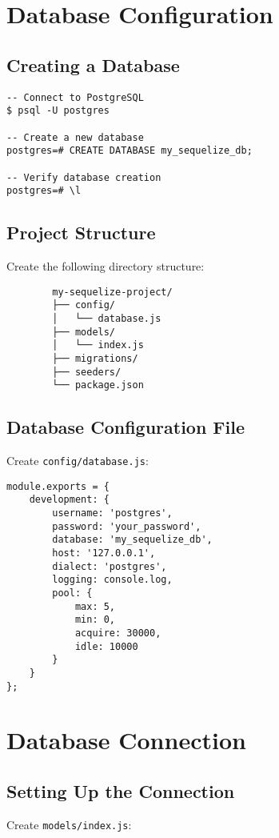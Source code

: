 \documentclass[12pt,a4paper]{book}
\begin{document}
	\section{Database Configuration}
	
	\subsection{Creating a Database}
	\begin{tcolorbox}[title=PostgreSQL Commands]
		\begin{verbatim}
-- Connect to PostgreSQL
$ psql -U postgres

-- Create a new database
postgres=# CREATE DATABASE my_sequelize_db;

-- Verify database creation
postgres=# \l
		\end{verbatim}
	\end{tcolorbox}
	
	\subsection{Project Structure}
	Create the following directory structure:
	
	\begin{verbatim}
		my-sequelize-project/
		├── config/
		│   └── database.js
		├── models/
		│   └── index.js
		├── migrations/
		├── seeders/
		└── package.json
	\end{verbatim}
	
	\subsection{Database Configuration File}
	Create \texttt{config/database.js}:
	
	\begin{verbatim}
module.exports = {
	development: {
		username: 'postgres',
		password: 'your_password',
		database: 'my_sequelize_db',
		host: '127.0.0.1',
		dialect: 'postgres',
		logging: console.log,
		pool: {
			max: 5,
			min: 0,
			acquire: 30000,
			idle: 10000
		}
	}
};
	\end{verbatim}
	
	\section{Database Connection}
	
	\subsection{Setting Up the Connection}
	Create \texttt{models/index.js}:
	
\end{document}
